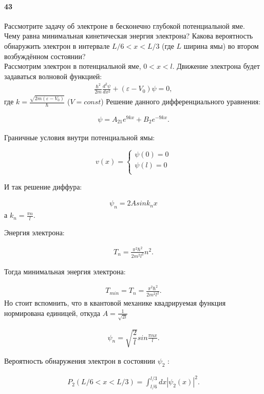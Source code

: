 




\paragraph{43}
Рассмотрите задачу об электроне в бесконечно глубокой потенциальной яме. Чему равна минимальная кинетическая энергия электрона? Какова вероятность обнаружить электрон в интервале $L/6<x<L/3$ (где $L$ ширина ямы) во втором возбуждённом состоянии?\\

Рассмотрим электрон в потенциальной яме, $0<x<l$.
Движение электрона будет задаваться волновой функцией:
\begin{gather}
 \frac{\hbar^{2}}{2m}\frac{d^{2}\psi}{dx^{2}}+(\varepsilon-V_{0})\psi=0,
\end{gather}
где $k=\frac{\sqrt{2m(\varepsilon-V_{0})}}{\hbar}$ ($V=const$)
Решение данного дифференциального уравнения:

\begin{gather}
\psi=A_{21}e^{9kx}+B_{2}e^{-9kx}.
\end{gather}

Граничные условия внутри потенциальной ямы:

$$
v(x)=
\left\{
\begin{gathered}
\psi(0)=0\\
\psi(l)=0\\
\end{gathered}
\right.
$$

И так решение диффура: 

\begin{gather}
\psi_{n}=2A sin{k_{n}x}
\end{gather}
а $k_{n}=\frac{\pi n}{l}.$

Энергия электрона:

\begin{gather}
T_{n}=\frac{\pi^{2}\hbar^{2}}{2m^{2}l^{2}}{}n^{2}.
\end{gather}

Тогда минимальная энергия электрона:

\begin{gather}
T_{min}=T_{n}=\frac{\pi^{2}\hbar^{2}}{2m^{2}l^{2}}.
\end{gather}
Но стоит вспомнить, что в квантовой механике квадрируемая функция нормирована единицей, откуда $A=\frac{1}{\sqrt{2l}}$

\begin{gather}
\psi_{n}=\sqrt{\dfrac{2}{l}} sin{\frac{\pi n x}{l}}.
\end{gather}

Вероятность обнаружения электрон в состоянии $\psi_{2}$ :

\begin{gather}
P_{2}(L/6<x<L/3)=\int_{l/6}^{l/3}dx|\psi_{2}(x)|^{2}.
\end{gather}



